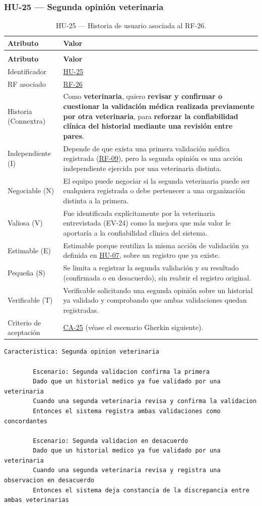 \documentclass[journal,onecolumn]{IEEEtran}
\makeatletter
\newenvironment{atributos}[2]{%
	\small
	\begin{longtable}{@{}>{\raggedright\arraybackslash}p{4.2cm} >{\raggedright\arraybackslash}p{11.2cm}@{}}
		\caption{#2}\label{tab:#1}\\
		\toprule
		\textbf{Atributo} & \textbf{Valor} \\
		\midrule
		\endfirsthead
		\multicolumn{2}{@{}l}{\small\itshape (continuación)}\\
		\toprule
		\textbf{Atributo} & \textbf{Valor} \\
		\midrule
		\endhead
		\bottomrule
		\endlastfoot
	}{%
	\end{longtable}
	\normalsize
}
\makeatother
\begin{document}
	\subsubsection{HU-25 --- Segunda opinión veterinaria}
	
	\begin{atributos}{HU-25}{HU-25 --- Historia de usuario asociada al RF-26.}
		Identificador & \hyperref[tab:HU-25]{HU-25} \\
		RF asociado & \hyperref[tab:RF-26]{RF-26} \\
		Historia (Connextra) & Como \textbf{veterinaria}, quiero \textbf{revisar y confirmar o cuestionar la validación médica realizada previamente por otra veterinaria}, para \textbf{reforzar la confiabilidad clínica del historial mediante una revisión entre pares}. \\
		Independiente (I) & Depende de que exista una primera validación médica registrada (\hyperref[tab:RF-09]{RF-09}), pero la segunda opinión es una acción independiente ejercida por una veterinaria distinta. \\
		Negociable (N) & El equipo puede negociar si la segunda veterinaria puede ser cualquiera registrada o debe pertenecer a una organización distinta a la primera. \\
		Valiosa (V) & Fue identificada explícitamente por la veterinaria entrevistada (EV-24) como la mejora que más valor le aportaría a la confiabilidad clínica del sistema. \\
		Estimable (E) & Estimable porque reutiliza la misma acción de validación ya definida en \hyperref[tab:HU-07]{HU-07}, sobre un registro que ya existe. \\
		Pequeña (S) & Se limita a registrar la segunda validación y su resultado (confirmada o en desacuerdo), sin reabrir el registro original. \\
		Verificable (T) & Verificable solicitando una segunda opinión sobre un historial ya validado y comprobando que ambas validaciones quedan registradas. \\
		Criterio de aceptación & \hyperref[lst:ca25]{CA-25} (véase el escenario Gherkin siguiente). \\
	\end{atributos}
	
	\begin{lstlisting}[style=gherkin,caption={CA-25 --- Escenario de aceptación de la historia HU-25.},label={lst:ca25}]
		Caracteristica: Segunda opinion veterinaria
		
		Escenario: Segunda validacion confirma la primera
		Dado que un historial medico ya fue validado por una veterinaria
		Cuando una segunda veterinaria revisa y confirma la validacion
		Entonces el sistema registra ambas validaciones como concordantes
		
		Escenario: Segunda validacion en desacuerdo
		Dado que un historial medico ya fue validado por una veterinaria
		Cuando una segunda veterinaria revisa y registra una observacion en desacuerdo
		Entonces el sistema deja constancia de la discrepancia entre ambas veterinarias
	\end{lstlisting}
	
\end{document}
